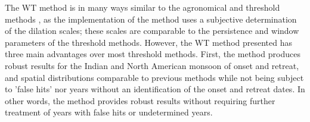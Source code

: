 


The WT method is in many ways similar to the agronomical and threshold methods \citep[e.g.][]{liebmann2001interannual,moron2014interannual}, as the implementation of the method uses a subjective determination of the dilation scales; these scales are comparable to the persistence and window parameters of the threshold methods. However, the WT method presented has three main advantages over most threshold methods. First, the method produces robust results for the Indian and North American monsoon of onset and retreat, and spatial distributions comparable to previous methods \citep{moron2014interannual} while not being subject to 'false hits' nor years without an identification of the onset and retreat dates. In other words, the method provides robust results without requiring further treatment of years with false hits or undetermined years. 

